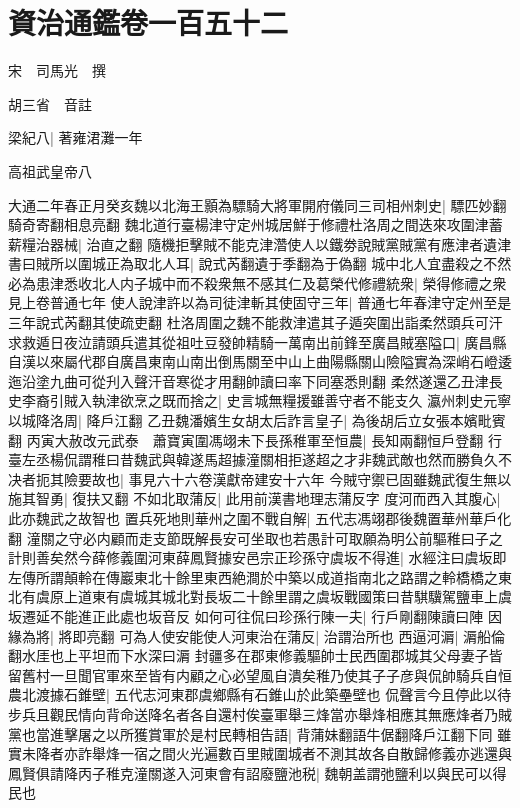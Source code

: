 \chapter{資治通鑑卷一百五十二}
宋　司馬光　撰

胡三省　音註

梁紀八|{
	著雍涒灘一年}


高祖武皇帝八

大通二年春正月癸亥魏以北海王顥為驃騎大將軍開府儀同三司相州刺史|{
	驃匹妙翻騎奇寄翻相息亮翻}
魏北道行臺楊津守定州城居鮮于修禮杜洛周之間迭來攻圍津蓄薪糧治器械|{
	治直之翻}
隨機拒擊賊不能克津濳使人以鐵劵說賊黨賊黨有應津者遺津書曰賊所以圍城正為取北人耳|{
	說式芮翻遺于季翻為于偽翻}
城中北人宜盡殺之不然必為患津悉收北人内子城中而不殺衆無不感其仁及葛榮代修禮統衆|{
	榮得修禮之衆見上卷普通七年}
使人說津許以為司徒津斬其使固守三年|{
	普通七年春津守定州至是三年說式芮翻其使疏吏翻}
杜洛周圍之魏不能救津遣其子遁突圍出詣柔然頭兵可汗求救遁日夜泣請頭兵遣其從祖吐豆發帥精騎一萬南出前鋒至廣昌賊塞隘口|{
	廣昌縣自漢以來屬代郡自廣昌東南山南出倒馬關至中山上曲陽縣關山險隘實為深峭石嶝逶迤沿塗九曲可從刋入聲汗音寒從才用翻帥讀曰率下同塞悉則翻}
柔然遂還乙丑津長史李裔引賊入執津欲烹之既而捨之|{
	史言城無糧援雖善守者不能支久}
瀛州刺史元寧以城降洛周|{
	降戶江翻}
乙丑魏潘嬪生女胡太后詐言皇子|{
	為後胡后立女張本嬪毗賓翻}
丙寅大赦改元武泰　蕭寶寅圍馮翊未下長孫稚軍至恒農|{
	長知兩翻恒戶登翻}
行臺左丞楊侃謂稚曰昔魏武與韓遂馬超據潼關相拒遂超之才非魏武敵也然而勝負久不决者扼其險要故也|{
	事見六十六卷漢獻帝建安十六年}
今賊守禦已固雖魏武復生無以施其智勇|{
	復扶又翻}
不如北取蒲反|{
	此用前漢書地理志蒲反字}
度河而西入其腹心|{
	此亦魏武之故智也}
置兵死地則華州之圍不戰自解|{
	五代志馮翊郡後魏置華州華戶化翻}
潼關之守必内顧而走支節既解長安可坐取也若愚計可取願為明公前驅稚曰子之計則善矣然今薛修義圍河東薛鳳賢據安邑宗正珍孫守虞坂不得進|{
	水經注曰虞坂即左傳所謂顛軨在傳巖東北十餘里東西絶澗於中築以成道指南北之路謂之軨橋橋之東北有虞原上道東有虞城其城北對長坂二十餘里謂之虞坂戰國策曰昔騏驥駕鹽車上虞坂遷延不能進正此處也坂音反}
如何可往侃曰珍孫行陳一夫|{
	行戶剛翻陳讀曰陣}
因緣為將|{
	將即亮翻}
可為人使安能使人河東治在蒲反|{
	治謂治所也}
西逼河漘|{
	漘船倫翻水厓也上平坦而下水深曰漘}
封疆多在郡東修義驅帥士民西圍郡城其父母妻子皆留舊村一旦聞官軍來至皆有内顧之心必望風自潰矣稚乃使其子子彦與侃帥騎兵自恒農北渡據石錐壁|{
	五代志河東郡虞鄉縣有石錐山於此築壘壁也}
侃聲言今且停此以待步兵且觀民情向背命送降名者各自還村俟臺軍舉三烽當亦舉烽相應其無應烽者乃賊黨也當進擊屠之以所獲賞軍於是村民轉相告語|{
	背蒲妹翻語牛倨翻降戶江翻下同}
雖實未降者亦詐舉烽一宿之間火光遍數百里賊圍城者不測其故各自散歸修義亦逃還與鳳賢俱請降丙子稚克潼關遂入河東會有詔廢鹽池税|{
	魏朝盖謂弛鹽利以與民可以得民也}
